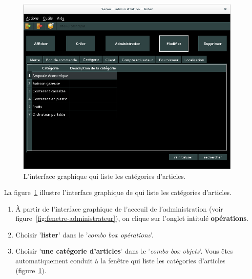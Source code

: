 
\newpage
{}\label{sec:administration-categorie-lister}

\begin{figure}[!htpb]
	\centering
	\includegraphics[scale=0.45]{images/categorie-articles-lister.png}
	\caption{L'interface graphique qui liste les cat\'egories d'articles.}
	\label{fig:admin-categories-articles-lister}
\end{figure}

La figure~\ref{fig:admin-categories-articles-lister} illustre
l'interface graphique de \yeren qui liste les cat\'egories
d'articles.

\begin{enumerate}[1)]
	\item \`A partir de l'interface graphique de l'acceuil de
		l'administration (voir figure~\ref{fig:fenetre-administrateur}),
		on clique sur l'onglet intitul\'e \textbf{op\'erations}. 
		
	\item Choisir '\textbf{lister}' dans le '\emph{combo box
		op\'erations}'.
		
	\item Choisir '\textbf{une cat\'egorie d'articles}' dans
		le '\emph{combo box objets}'. Vous \^etes automatiquement
		conduit \`a la fen\^etre qui liste les cat\'egories
		d'articles (figure~\ref{fig:admin-categories-articles-lister}).
\end{enumerate}

